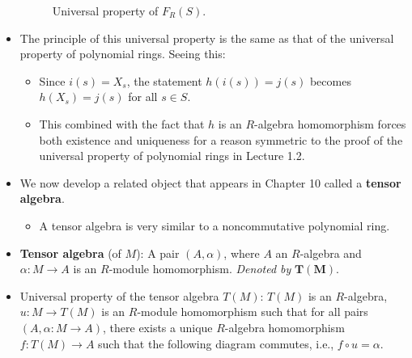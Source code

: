 \documentclass[../notes.tex]{subfiles}
\begin{document}
\begin{itemize}
\begin{figure}[H]
        \caption{Universal property of $F_R(S)$.}
        \label{fig:univPropFRS}
    \end{figure}
    \item The principle of this universal property is the same as that of the universal property of polynomial rings. Seeing this:
    \begin{itemize}
        \item Since $i(s)=X_s$, the statement $h(i(s))=j(s)$ becomes $h(X_s)=j(s)$ for all $s\in S$.
        \item This combined with the fact that $h$ is an $R$-algebra homomorphism forces both existence and uniqueness for a reason symmetric to the proof of the universal property of polynomial rings in Lecture 1.2.
    \end{itemize}
    \item We now develop a related object that appears in Chapter 10 called a \textbf{tensor algebra}.
    \begin{itemize}
        \item A tensor algebra is very similar to a noncommutative polynomial ring.
    \end{itemize}
    \item \textbf{Tensor algebra} (of $M$): A pair $(A,\alpha)$, where $A$ an $R$-algebra and $\alpha:M\to A$ is an $R$-module homomorphism. \emph{Denoted by} $\bm{T(M)}$.
    \item Universal property of the tensor algebra $T(M)$: $T(M)$ is an $R$-algebra, $u:M\to T(M)$ is an $R$-module homomorphism such that for all pairs $(A,\alpha:M\to A)$, there exists a unique $R$-algebra homomorphism $f:T(M)\to A$ such that the following diagram commutes, i.e., $f\circ u=\alpha$.
    \begin{figure}[H]
        \centering
\end{figure}
\end{itemize}
\end{document}
